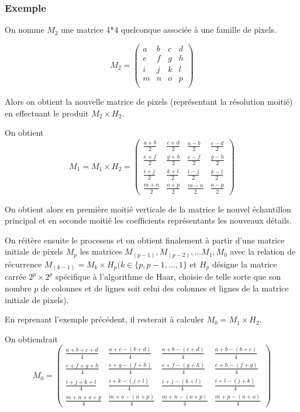 \documentclass{article}
\begin{document}
\subsubsection{Exemple}

On nomme $M_2$ une matrice 4*4 quelconque associée à une famille de pixels.

\[ M_2 = \begin{pmatrix}
 a & b & c & d \\
 e & f & g & h \\
 i & j & k & l \\
 m & n & o & p \\
\end{pmatrix} 
\]

Alors on obtient la nouvelle matrice de pixels (représentant la résolution moitié) en effectuant le produit $M_2 \times H_2$.

On obtient \[ M_1 = M_1 \times H_2 = 
\begin{pmatrix}
\frac{a+b}{2} & \frac{c+d}{2} & \frac{a-b}{2} & \frac{c-d}{2} \\
\frac{e+f}{2} & \frac{g+h}{2} & \frac{e-f}{2} & \frac{g-h}{2} \\
\frac{i+j}{2} & \frac{k+l}{2} & \frac{i-j}{2} & \frac{k-l}{2} \\
\frac{m+n}{2} & \frac{o+p}{2} & \frac{m-n}{2} & \frac{o-p}{2} 
\end{pmatrix}
\]

On obtient alors en première moitié verticale de la matrice le nouvel échantillon principal et en seconde moitié les coefficients représentants les nouveaux détails.

On réitère ensuite le processus et on obtient finalement à partir d’une matrice initiale de pixels $M_p$ les matrices $M_(p-1), M_(p-2),… M_1, M_0$ avec la relation de récurrence $M_(k-1) = M_k \times H_p (k \in \{p,p-1,…,1\}$ et $H_p$ désigne la matrice carrée $2^p \times 2^p$ spécifique à l’algorithme de Haar, choisie de telle sorte que son nombre $p$ de colonnes et de lignes soit celui des colonnes et lignes de la matrice initiale de pixels). 

En reprenant l’exemple précédent, il resterait à calculer $M_0 = M_1 \times H_2$.

On obtiendrait \[ M_0 = \begin{pmatrix}
\frac{a+b+c+d}{4} & \frac{a+c-(b+d)}{4} & \frac{a+b-(c+d)}{4} & \frac{a+b-(b+c)}{4} \\
\frac{e+f+g+h}{4} & \frac{e+g-(f+h)}{4} & \frac{e+f-(g+h)}{4} & \frac{e+h-(f+g)}{4} \\
\frac{i+j+k+l}{4} & \frac{i+k-(j+l)}{4} & \frac{i+j-(k+l)}{4} & \frac{i+l-(j+k)}{4} \\
\frac{m+n+o+p}{4} & \frac{m+o-(n+p)}{4} & \frac{m+n-(o+p)}{4} & \frac{m+p-(n+o)}{4} 
\end{pmatrix}
\]
\end{document}

